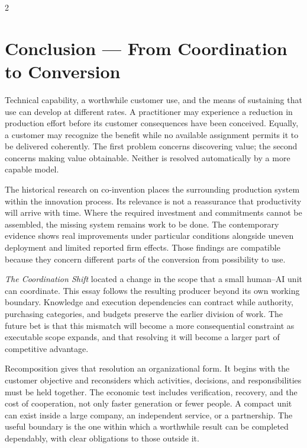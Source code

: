 \clearpage
\begin{multicols}{2}

\section{Conclusion --- From Coordination to
Conversion}\label{conclusion-from-coordination-to-conversion}

Technical capability, a worthwhile customer use, and the means of
sustaining that use can develop at different rates. A practitioner may
experience a reduction in production effort before its customer
consequences have been conceived. Equally, a customer may recognize the
benefit while no available assignment permits it to be delivered
coherently. The first problem concerns discovering value; the second
concerns making value obtainable. Neither is resolved automatically by a
more capable model.

The historical research on co-invention \citep{bresnahan1996coinvention}
places the surrounding production system within the innovation process.
Its relevance is not a reassurance that productivity will arrive with
time. Where the required investment and commitments cannot be assembled,
the missing system remains work to be done. The contemporary evidence
shows real improvements under particular conditions alongside uneven
deployment and limited reported firm effects. Those findings are
compatible because they concern different parts of the conversion from
possibility to use.

\emph{The Coordination Shift} \citep{blomgren2025coordination} located a
change in the scope that a small human--AI unit can coordinate. This
essay follows the resulting producer beyond its own working boundary.
Knowledge and execution dependencies can contract while authority,
purchasing categories, and budgets preserve the earlier division of
work. The future bet is that this mismatch will become a more
consequential constraint as executable scope expands, and that resolving
it will become a larger part of competitive advantage.

Recomposition gives that resolution an organizational form. It begins
with the customer objective and reconsiders which activities, decisions,
and responsibilities must be held together. The economic test includes
verification, recovery, and the cost of cooperation, not only faster
generation or fewer people. A compact unit can exist inside a large
company, an independent service, or a partnership. The useful boundary
is the one within which a worthwhile result can be completed dependably,
with clear obligations to those outside it.


\end{multicols}
